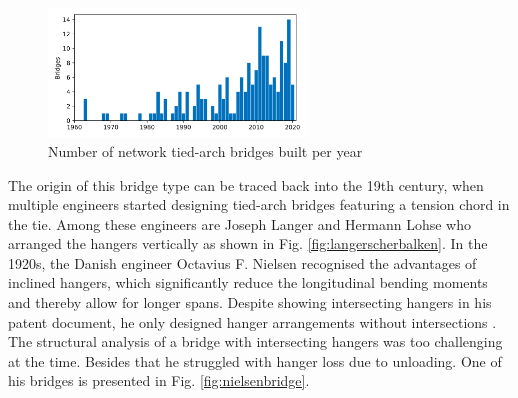 \begin{figure}[H]
    \centering
    \includegraphics[trim={0 2.2cm 0 1.8cm},clip, width=0.61\textwidth]{overleaf/Pictures/myplot.png}
    \caption{Number of network tied-arch bridges built per year \cite{Cavegn}}
    \label{fig:yearly_bridges}
\end{figure}

The origin of this bridge type can be traced back into the 19th century, when multiple engineers started designing tied-arch bridges featuring a tension chord in the tie. Among these engineers are Joseph Langer and Hermann Lohse who arranged the hangers vertically as shown in Fig. \ref{fig:langerscherbalken}. In the 1920s, the Danish engineer Octavius F. Nielsen recognised the advantages of inclined hangers, which significantly reduce the longitudinal bending moments and thereby allow for longer spans. Despite showing intersecting hangers in his patent document, he only designed hanger arrangements without intersections \cite{Tveit}. The structural analysis of a bridge with intersecting hangers was too challenging at the time. Besides that he struggled with hanger loss due to unloading. One of his bridges is presented in Fig. \ref{fig:nielsenbridge}. \\

